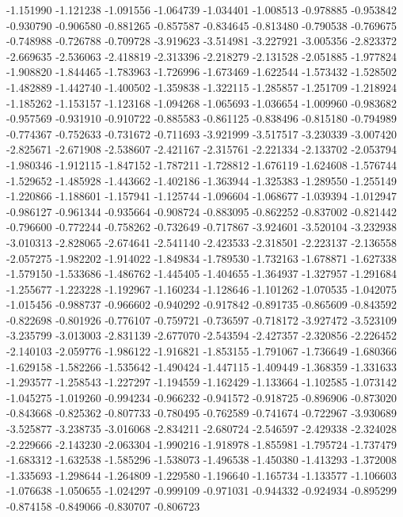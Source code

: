 -1.151990
-1.121238
-1.091556
-1.064739
-1.034401
-1.008513
-0.978885
-0.953842
-0.930790
-0.906580
-0.881265
-0.857587
-0.834645
-0.813480
-0.790538
-0.769675
-0.748988
-0.726788
-0.709728
-3.919623
-3.514981
-3.227921
-3.005356
-2.823372
-2.669635
-2.536063
-2.418819
-2.313396
-2.218279
-2.131528
-2.051885
-1.977824
-1.908820
-1.844465
-1.783963
-1.726996
-1.673469
-1.622544
-1.573432
-1.528502
-1.482889
-1.442740
-1.400502
-1.359838
-1.322115
-1.285857
-1.251709
-1.218924
-1.185262
-1.153157
-1.123168
-1.094268
-1.065693
-1.036654
-1.009960
-0.983682
-0.957569
-0.931910
-0.910722
-0.885583
-0.861125
-0.838496
-0.815180
-0.794989
-0.774367
-0.752633
-0.731672
-0.711693
-3.921999
-3.517517
-3.230339
-3.007420
-2.825671
-2.671908
-2.538607
-2.421167
-2.315761
-2.221334
-2.133702
-2.053794
-1.980346
-1.912115
-1.847152
-1.787211
-1.728812
-1.676119
-1.624608
-1.576744
-1.529652
-1.485928
-1.443662
-1.402186
-1.363944
-1.325383
-1.289550
-1.255149
-1.220866
-1.188601
-1.157941
-1.125744
-1.096604
-1.068677
-1.039394
-1.012947
-0.986127
-0.961344
-0.935664
-0.908724
-0.883095
-0.862252
-0.837002
-0.821442
-0.796600
-0.772244
-0.758262
-0.732649
-0.717867
-3.924601
-3.520104
-3.232938
-3.010313
-2.828065
-2.674641
-2.541140
-2.423533
-2.318501
-2.223137
-2.136558
-2.057275
-1.982202
-1.914022
-1.849834
-1.789530
-1.732163
-1.678871
-1.627338
-1.579150
-1.533686
-1.486762
-1.445405
-1.404655
-1.364937
-1.327957
-1.291684
-1.255677
-1.223228
-1.192967
-1.160234
-1.128646
-1.101262
-1.070535
-1.042075
-1.015456
-0.988737
-0.966602
-0.940292
-0.917842
-0.891735
-0.865609
-0.843592
-0.822698
-0.801926
-0.776107
-0.759721
-0.736597
-0.718172
-3.927472
-3.523109
-3.235799
-3.013003
-2.831139
-2.677070
-2.543594
-2.427357
-2.320856
-2.226452
-2.140103
-2.059776
-1.986122
-1.916821
-1.853155
-1.791067
-1.736649
-1.680366
-1.629158
-1.582266
-1.535642
-1.490424
-1.447115
-1.409449
-1.368359
-1.331633
-1.293577
-1.258543
-1.227297
-1.194559
-1.162429
-1.133664
-1.102585
-1.073142
-1.045275
-1.019260
-0.994234
-0.966232
-0.941572
-0.918725
-0.896906
-0.873020
-0.843668
-0.825362
-0.807733
-0.780495
-0.762589
-0.741674
-0.722967
-3.930689
-3.525877
-3.238735
-3.016068
-2.834211
-2.680724
-2.546597
-2.429338
-2.324028
-2.229666
-2.143230
-2.063304
-1.990216
-1.918978
-1.855981
-1.795724
-1.737479
-1.683312
-1.632538
-1.585296
-1.538073
-1.496538
-1.450380
-1.413293
-1.372008
-1.335693
-1.298644
-1.264809
-1.229580
-1.196640
-1.165734
-1.133577
-1.106603
-1.076638
-1.050655
-1.024297
-0.999109
-0.971031
-0.944332
-0.924934
-0.895299
-0.874158
-0.849066
-0.830707
-0.806723
